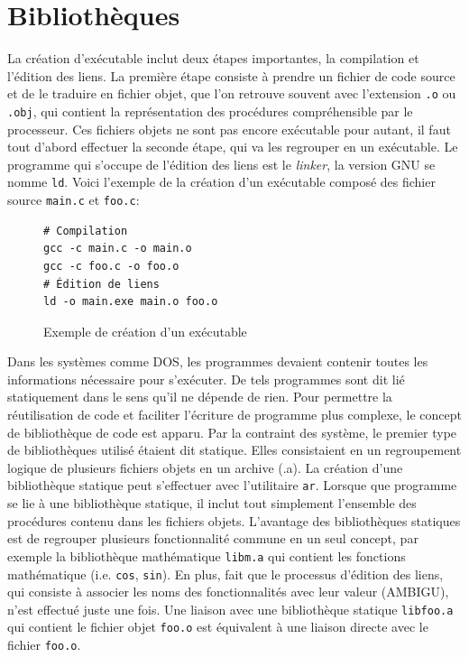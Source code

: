 
\chapter[]{Bibliothèques}%
La création d'exécutable inclut deux étapes importantes, la compilation et
l'édition des liens. La première étape consiste à prendre un fichier de code
source et de le traduire en fichier objet, que l'on retrouve souvent avec
l'extension \verb|.o| ou \verb|.obj|, qui contient la représentation des
procédures compréhensible par le processeur. Ces fichiers objets ne sont pas
encore exécutable pour autant, il faut tout d'abord effectuer la seconde étape,
qui va les regrouper en un exécutable. Le programme qui s'occupe de l'édition
des liens est le \textit{linker}, la version GNU se nomme \verb|ld|.  Voici
l'exemple de la création d'un exécutable composé des fichier source
\verb|main.c| et \verb|foo.c|:

\begin{figure}[ht]
    \begin{minipage}[t]{0.5\textwidth}
\begin{verbatim}
# Compilation
gcc -c main.c -o main.o
gcc -c foo.c -o foo.o
# Édition de liens
ld -o main.exe main.o foo.o
\end{verbatim}
    \end{minipage}

    \caption{Exemple de création d'un exécutable}
\end{figure}

Dans les systèmes comme DOS, les programmes devaient contenir toutes les
informations nécessaire pour s'exécuter. De tels programmes sont dit lié
statiquement dans le sens qu'il ne dépende de rien. Pour permettre la
réutilisation de code et faciliter l'écriture de programme plus complexe,
le concept de bibliothèque de code est apparu. Par la contraint des
système, le premier type de bibliothèques utilisé étaient dit statique.
Elles consistaient en un regroupement logique de plusieurs fichiers objets en
un archive (.a). La création d'une bibliothèque statique peut s'effectuer avec
l'utilitaire \verb|ar|. Lorsque que programme se lie à une bibliothèque
statique, il inclut tout simplement l'ensemble des procédures contenu dans les
fichiers objets. L'avantage des bibliothèques statiques est de regrouper
plusieurs fonctionnalité commune en un seul concept, par exemple la
bibliothèque mathématique \verb|libm.a| qui contient les fonctions mathématique
(i.e. \verb|cos|, \verb|sin|).  En plus,  fait que le processus d'édition des
liens, qui consiste à associer les noms des fonctionnalités avec leur valeur (AMBIGU), n'est
effectué juste une fois. Une liaison avec une bibliothèque statique
\verb|libfoo.a| qui contient le fichier objet \verb|foo.o| est équivalent à une
liaison directe avec le fichier \verb|foo.o|.

